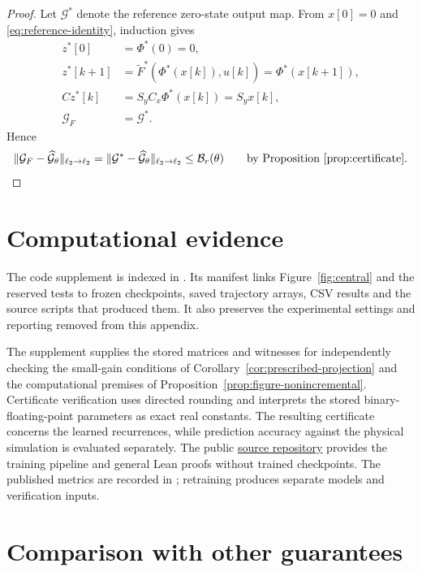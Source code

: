 \documentclass{l4dc2027}
\begin{document}
\begin{proof}
Let \mbox{$\mathcal G^*$} denote the reference zero-state output map.
From \mbox{$x[0]=0$} and \eqref{eq:reference-identity}, induction gives
\[
 \begin{aligned}
 z^*[0]&=\Phi^*(0)=0,\\
 z^*[k+1]&=\widetilde F^*(\Phi^*(x[k]),u[k])
          =\Phi^*(x[k+1]),\\
 Cz^*[k]&=S_yC_x\Phi^*(x[k])=S_yx[k],\\
 \mathcal G_F&=\mathcal G^*.
 \end{aligned}
\]
Hence
\[
 \|\mathcal G_F-\widehat{\mathcal G}_\theta\|_{\ell_2\to\ell_2}
 =\|\mathcal G^*-\widehat{\mathcal G}_\theta\|_{\ell_2\to\ell_2}
 \le\mathcal B_r(\theta)
 \qquad\text{by Proposition~\ref{prop:certificate}}.
\]
\end{proof}

\section{Computational evidence}\label{app:experiment}
The code supplement is indexed in .
Its manifest links Figure~\ref{fig:central} and the reserved tests to frozen checkpoints, saved trajectory arrays, CSV results and the source scripts that produced them.
It also preserves the experimental settings and reporting removed from this appendix.

The supplement supplies the stored matrices and witnesses for independently checking the small-gain conditions of Corollary~\ref{cor:prescribed-projection} and the computational premises of Proposition~\ref{prop:figure-nonincremental}.
Certificate verification uses directed rounding and interprets the stored binary-floating-point parameters as exact real constants.
The resulting certificate concerns the learned recurrences, while prediction accuracy against the physical simulation is evaluated separately.
The public \href{https://github.com/Populustremuloides/certified-nonlinear-reduction}{source repository} provides the training pipeline and general Lean proofs without trained checkpoints.
The published metrics are recorded in ; retraining produces separate models and verification inputs.

\section{Comparison with other guarantees}\label{app:scope}
\end{document}
